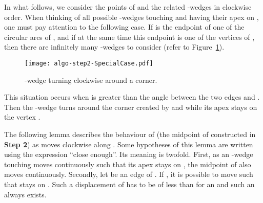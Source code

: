 \documentclass[11pt, oneside]{article}
\begin{document}
In what follows,
we consider the points of  
and the related -wedges
in clockwise order.
When thinking of all possible -wedges touching 
and having their apex on ,
one must pay attention to the following case.
If  is the endpoint of one of the circular arcs  of ,
and if at the same time this endpoint is one of the vertices  of ,
then there are infinitely many -wedges to consider
(refer to Figure~\ref{fig algo-step2-SpecialCase}).
\begin{figure}
\centering
\texttt{[image: algo-step2-SpecialCase.pdf]}
\caption{-wedge turning clockwise around a corner.\label{fig algo-step2-SpecialCase}}
\end{figure}
This situation occurs when  is greater 
than the angle between the two edges  and .
Then the -wedge turns
around the corner created by  and 
while its apex  stays on the vertex .

The following lemma
describes the behaviour of 
(the midpoint of  constructed in {\bf Step 2})
as  moves clockwise along .
Some hypotheses of this lemma
are written using the expression ``close enough''.
Its meaning is twofold.
First,
as an -wedge  touching 
moves continuously
such that its apex  stays on ,
the midpoint  of  
also moves continuously.
Secondly,
let  be an edge of .
If ,
it is possible to move  
such that  stays on .
Such a displacement of  has to be 
of less than  for an 
and such an  always exists.
\end{document}
